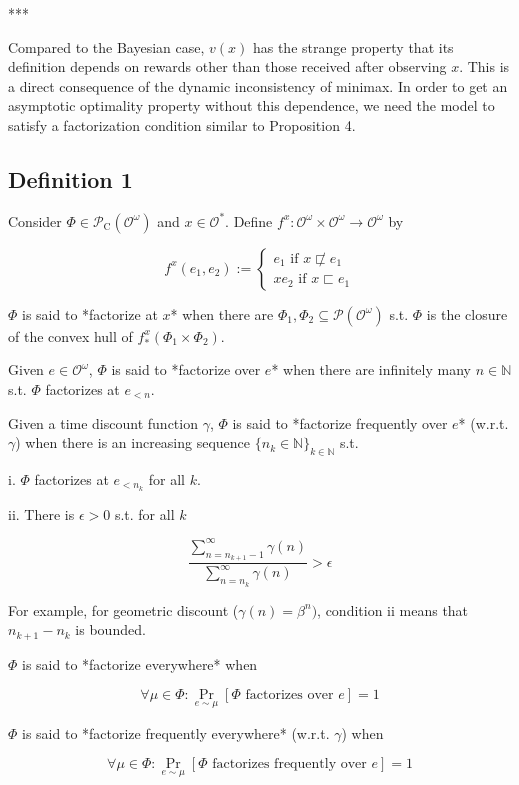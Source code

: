 \documentclass[a4paper]{article}
\DeclareMathOperator{\Prb}{Pr}
\newcommand{\Nats}{\mathbb{N}}
\newcommand{\Prob}{\mathcal{P}}
\newcommand{\Obs}{\mathcal{O}}
\newcommand{\ObsO}{\Obs^\omega}
\newcommand{\CC}{\mathcal{P}_{\operatorname{C}}}
\begin{document}
***

Compared to the Bayesian case, ${v(x)}$ has the strange property that its definition depends on rewards other than those received after observing ${x}$. This is a direct consequence of the dynamic inconsistency of minimax. In order to get an asymptotic optimality property without this dependence, we need the model to satisfy a factorization condition similar to Proposition 4.

\subsection{Definition 1}

Consider ${\Phi \in \CC(\ObsO)}$ and ${x \in \Obs^*}$. Define ${f^x: \ObsO \times \ObsO \rightarrow \ObsO}$ by

$${f^x(e_1,e_2):=\begin{cases}e_1 \text{ if } x \not\sqsubset e_1 \\xe_2 \text{ if } x \sqsubset e_1\end{cases}}$$

${\Phi}$ is said to *factorize at ${x}$* when there are ${\Phi_1, \Phi_2 \subseteq \Prob(\ObsO)}$ s.t. ${\Phi}$ is the closure of the convex hull of ${f^x_*(\Phi_1 \times \Phi_2)}$.

Given ${e \in \ObsO}$, ${\Phi}$ is said to *factorize over ${e}$* when there are infinitely many ${n \in \Nats}$ s.t. ${\Phi}$ factorizes at ${e_{<n}}$.

Given a time discount function ${\gamma}$, ${\Phi}$ is said to *factorize frequently over ${e}$* (w.r.t. ${\gamma}$) when there is an increasing sequence ${\{n_k \in \Nats\}_{k \in \Nats}}$ s.t.

i. ${\Phi}$ factorizes at ${e_{<n_k}}$ for all ${k}$.

ii. There is ${\epsilon > 0}$ s.t. for all ${k}$

$$\frac{\sum_{n = n_{k+1}-1}^\infty \gamma(n)}{\sum_{n = n_{k}}^\infty \gamma(n)} > \epsilon$$

For example, for geometric discount (${\gamma(n)=\beta^n)}$, condition ii means that ${n_{k+1}-n_k}$  is bounded.

${\Phi}$ is said to *factorize everywhere* when 

$${\forall \mu \in \Phi: \Prb_{e \sim \mu}[\Phi \text{ factorizes over } e] = 1}$$

${\Phi}$ is said to *factorize frequently everywhere* (w.r.t. ${\gamma}$) when

$${\forall \mu \in \Phi: \Prb_{e \sim \mu}[\Phi \text{ factorizes frequently over } e] = 1}$$
\end{document}
